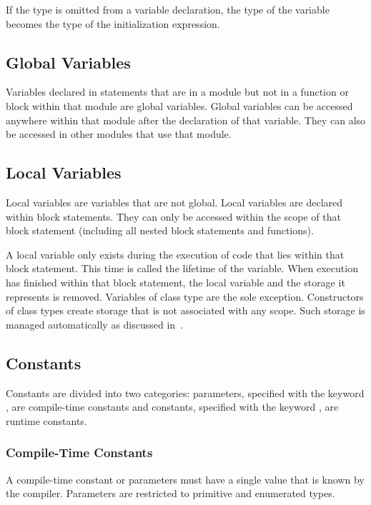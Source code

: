 If the type is omitted from a variable declaration, the type of the
variable becomes the type of the initialization expression.

\subsection{Global Variables}
\label{Global_Variables}

Variables declared in statements that are in a module but not in a
function or block within that module are global variables.  Global
variables can be accessed anywhere within that module after the
declaration of that variable.  They can also be accessed in other
modules that use that module.

\subsection{Local Variables}
\label{Local_Variables}

Local variables are variables that are not global.  Local variables
are declared within block statements.  They can only be accessed
within the scope of that block statement (including all nested block
statements and functions).

A local variable only exists during the execution of code that lies
within that block statement.  This time is called the lifetime of the
variable.  When execution has finished within that block statement,
the local variable and the storage it represents is removed.
Variables of class type are the sole exception.  Constructors of class
types create storage that is not associated with any scope.  Such
storage is managed automatically as discussed
in~.

\subsection{Constants}
\label{Constants}

Constants are divided into two categories: parameters, specified with
the keyword , are compile-time constants and constants,
specified with the keyword , are runtime constants.

\subsubsection{Compile-Time Constants}
\label{Compile-Time_Constants}

A compile-time constant or parameters must have a single value that is
known by the compiler.  Parameters are restricted to primitive and
enumerated types.

